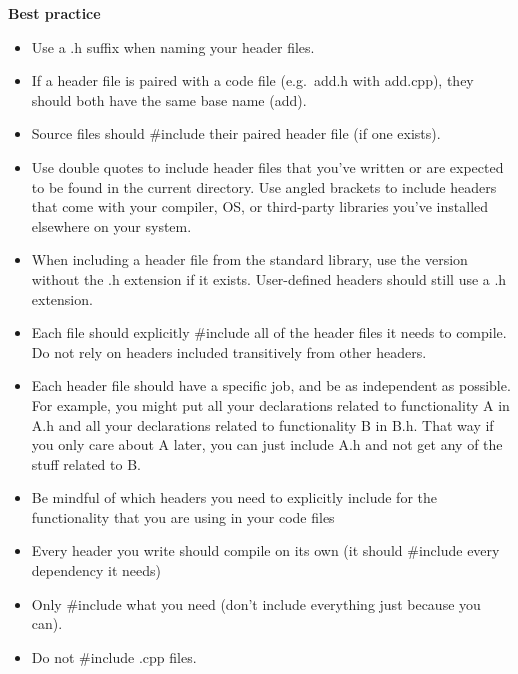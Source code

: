 \documentclass[
  letterpaper,
  DIV=11,
  numbers=noendperiod]{scrreprt}
\begin{document}
\begin{tcolorbox}[enhanced jigsaw, toprule=.15mm, rightrule=.15mm, opacityback=0, breakable, leftrule=.75mm, colback=white, colframe=quarto-callout-tip-color-frame, arc=.35mm, left=2mm, bottomrule=.15mm]
\begin{minipage}[t]{5.5mm}
\textcolor{quarto-callout-tip-color}{\faLightbulb}
\end{minipage}%
\begin{minipage}[t]{\textwidth - 5.5mm}

\textbf{Best practice}\vspace{2mm}

\begin{itemize}
\item
  Use a .h suffix when naming your header files.
\item
  If a header file is paired with a code file (e.g.~add.h with add.cpp),
  they should both have the same base name (add).
\item
  Source files should \#include their paired header file (if one
  exists).
\item
  Use double quotes to include header files that you've written or are
  expected to be found in the current directory. Use angled brackets to
  include headers that come with your compiler, OS, or third-party
  libraries you've installed elsewhere on your system.
\item
  When including a header file from the standard library, use the
  version without the .h extension if it exists. User-defined headers
  should still use a .h extension.
\item
  Each file should explicitly \#include all of the header files it needs
  to compile. Do not rely on headers included transitively from other
  headers.
\item
  Each header file should have a specific job, and be as independent as
  possible. For example, you might put all your declarations related to
  functionality A in A.h and all your declarations related to
  functionality B in B.h. That way if you only care about A later, you
  can just include A.h and not get any of the stuff related to B.
\item
  Be mindful of which headers you need to explicitly include for the
  functionality that you are using in your code files
\item
  Every header you write should compile on its own (it should \#include
  every dependency it needs)
\item
  Only \#include what you need (don't include everything just because
  you can).
\item
  Do not \#include .cpp files.
\end{itemize}

\end{minipage}%
\end{tcolorbox}
\end{document}
